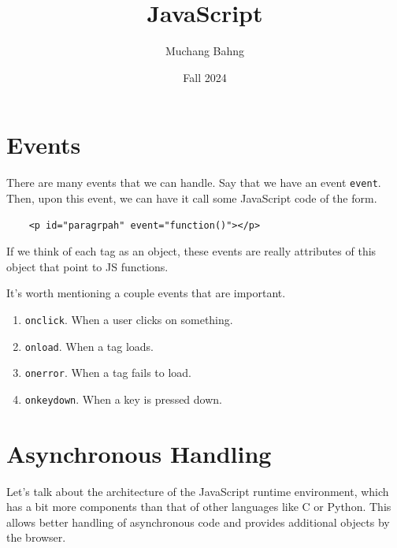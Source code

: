 \documentclass{article}
\begin{document}
\title{JavaScript}
\author{Muchang Bahng}
\date{Fall 2024}

\maketitle
\tableofcontents
\pagebreak

\section{Events} 
  
  There are many events that we can handle. Say that we have an event \texttt{event}. Then, upon this event, we can have it call some JavaScript code of the form. 
  \begin{lstlisting}
    <p id="paragrpah" event="function()"></p>
  \end{lstlisting}

  If we think of each tag as an object, these events are really attributes of this object that point to JS functions. 
 
  \begin{example}
    It's worth mentioning a couple events that are important. 
    \begin{enumerate}
      \item \texttt{onclick}. When a user clicks on something. 
      \item \texttt{onload}. When a tag loads. 
      \item \texttt{onerror}. When a tag fails to load.  
      \item \texttt{onkeydown}. When a key is pressed down. 
    \end{enumerate}
  \end{example}

\section{Asynchronous Handling}

  Let's talk about the architecture of the JavaScript runtime environment, which has a bit more components than that of other languages like C or Python. This allows better handling of asynchronous code and provides additional objects by the browser.  
\end{document}
